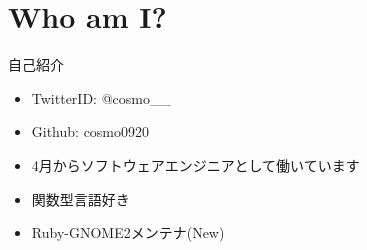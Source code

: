 \section{Who am I?}

\begin{frame}
\begin{block}{自己紹介}
\begin{itemize}
\item TwitterID: @cosmo\_\_
\item Github: cosmo0920
\item 4月からソフトウェアエンジニアとして働いています
\item 関数型言語好き
\item Ruby-GNOME2メンテナ(New)
\end{itemize}
\end{block}
\end{frame}
